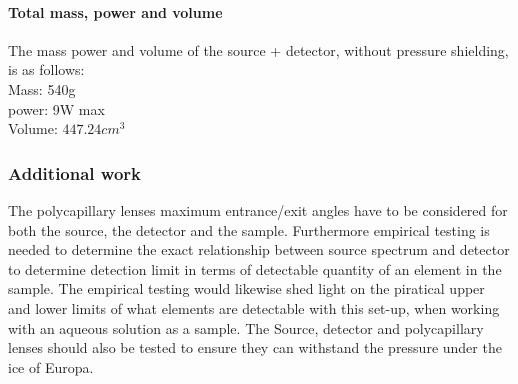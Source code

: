 \paragraph{Total mass, power and volume} The mass power and volume of the source + detector, without pressure shielding, is as follows:\\ 
Mass: 540g\\
power: 9W max\\
Volume: $447.24cm^{3}$\\

\subsubsection{Additional work}
The polycapillary lenses maximum entrance/exit angles have to be considered for both the source, the detector and the sample. Furthermore empirical testing is needed to determine the exact relationship between source spectrum and detector to determine detection limit in terms of detectable quantity of an element in the sample. The empirical testing would likewise shed light on the piratical upper and lower limits of what elements are detectable with this set-up, when working with an aqueous solution as a sample.
The Source, detector and polycapillary lenses should also be tested to ensure they can withstand the pressure under the ice of Europa.


